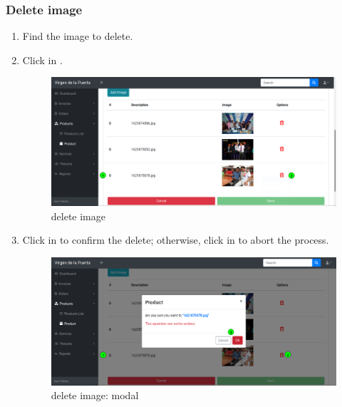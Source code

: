 \documentclass[a4paper,11pt]{refart}
\begin{document}
\subsubsection{Delete image}
\begin{enumerate}
	\item Find the image to delete.
	\item Click in .
	\begin{figure}[H]\centering
		\includegraphics[width=\textwidth]{images/image-delete.png}
		\caption{delete image}
		\label{fig:image-delete.png}
	\end{figure}
	\item Click in  to confirm the delete; otherwise, click in  to abort the process.
	\begin{figure}[H]\centering
		\includegraphics[width=\textwidth]{images/image-delete-modal.png}
		\caption{delete image: modal}
		\label{fig:image-delete-modal.png}
	\end{figure}
\end{enumerate}
\end{document}
